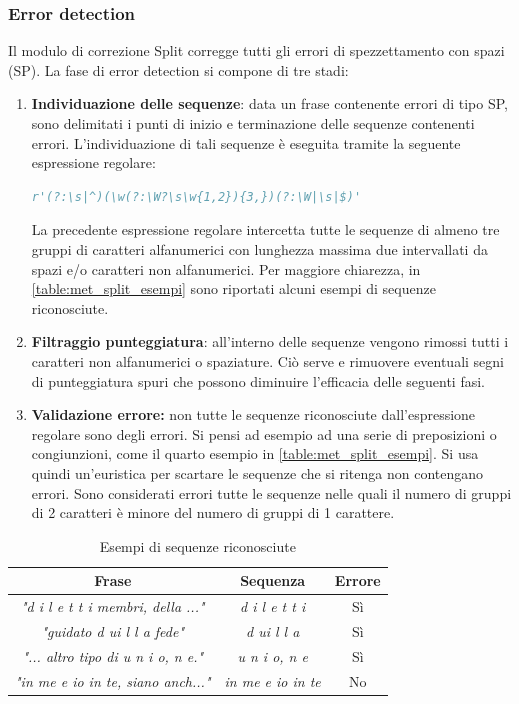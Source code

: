 \subsubsection{Error detection}
\label{sec:met_split_errdet}
Il modulo di correzione Split corregge tutti gli errori di spezzettamento con spazi (SP).
La fase di error detection si compone di tre stadi:
\begin{enumerate}
\item \textbf{Individuazione delle sequenze}: data un frase contenente errori di tipo SP, sono delimitati i punti di inizio e terminazione delle sequenze contenenti errori. L'individuazione di tali sequenze è eseguita tramite la seguente espressione regolare:
\begin{lstlisting}[language=Python]
r'(?:\s|^)(\w(?:\W?\s\w{1,2}){3,})(?:\W|\s|$)'
\end{lstlisting}
La precedente espressione regolare intercetta tutte le sequenze di almeno tre gruppi di caratteri alfanumerici con lunghezza massima due intervallati da spazi e/o caratteri non alfanumerici. Per maggiore chiarezza, in \autoref{table:met_split_esempi} sono riportati alcuni esempi di sequenze riconosciute.

\item \textbf{Filtraggio punteggiatura}: all'interno delle sequenze vengono rimossi tutti i caratteri non alfanumerici o spaziature. Ciò serve e rimuovere eventuali segni di punteggiatura spuri che possono diminuire l'efficacia delle seguenti fasi.

\item \textbf{Validazione errore:} non tutte le sequenze riconosciute dall'espressione regolare sono degli errori. Si pensi ad esempio ad una serie di preposizioni o congiunzioni, come il quarto esempio in \autoref{table:met_split_esempi}. Si usa quindi un'euristica per scartare le sequenze che si ritenga non contengano errori. Sono considerati errori tutte le sequenze nelle quali il numero di gruppi di 2 caratteri è minore del numero di gruppi di 1 carattere.

\end{enumerate}


\begin{table}[H]
	\centering
	\begin{tabular}{ccc}
	\textbf{Frase} & \textbf{Sequenza} & \textbf{Errore} \\ \hline
	
	\textit{"d i l e t t i membri, della ..."}	&	\textit{d i l e t t i}	&	Sì \\
	\textit{"guidato d ui l l a fede"}			& 	\textit{d ui l l a}		&	Sì \\
	\textit{"... altro tipo di u n i o, n e."}	&	\textit{u n i o, n e}	&	Sì \\
	\textit{"in me e io in te, siano anch..."}	&	\textit{in me e io in te}&	No
	\end{tabular}
	\caption{Esempi di sequenze riconosciute}
	\label{table:met_split_esempi}
\end{table}

